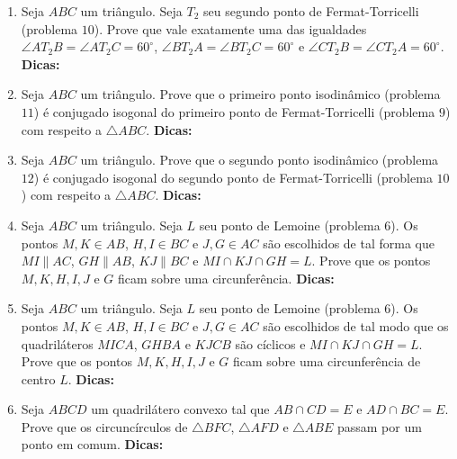 \documentclass{article}
\newcommand{\dica}{\textbf{Dicas:}}
\newcommand{\iniTri}{Seja $ABC$ um triângulo}
\begin{document}
\begin{multicols}{2}
\begin{enumerate}
    \item \iniTri. Seja $T_2$ seu segundo ponto de Fermat-Torricelli (problema $10$). Prove que vale exatamente uma das igualdades $\angle AT_2B=\angle AT_2C=60^{\circ}$, $\angle BT_2A=\angle BT_2C=60^{\circ}$ e $\angle CT_2B=\angle CT_2A=60^{\circ}$. \dica %
    
    \item \iniTri. Prove que o primeiro ponto isodinâmico (problema $11$) é conjugado isogonal do primeiro ponto de Fermat-Torricelli (problema $9$) com respeito a $\triangle ABC$. \dica %
    
    \item \iniTri. Prove que o segundo ponto isodinâmico (problema $12$) é conjugado isogonal do segundo ponto de Fermat-Torricelli (problema $10$) com respeito a $\triangle ABC$. \dica %
    
    \item \iniTri. Seja $L$ seu ponto de Lemoine (problema $6$). Os pontos $M,K\in AB$, $H,I\in BC$ e $J,G\in AC$ são escolhidos de tal forma que $MI\parallel AC$, $GH\parallel AB$, $KJ\parallel BC$ e $MI\cap KJ\cap GH=L$. Prove que os pontos $M,K,H,I,J$ e $G$ ficam sobre uma circunferência. \dica %
    
    \item \iniTri. Seja $L$ seu ponto de Lemoine (problema $6$). Os pontos $M,K\in AB$, $H,I\in BC$ e $J,G\in AC$ são escolhidos de tal modo que os quadriláteros $MICA$, $GHBA$ e $KJCB$ são cíclicos e $MI\cap KJ\cap GH=L$. Prove que os pontos $M,K,H,I,J$ e $G$ ficam sobre uma circunferência de centro $L$. \dica %
    
    \item Seja $ABCD$ um quadrilátero convexo tal que $AB\cap CD=E$ e $AD\cap BC=E$. Prove que os circuncírculos de $\triangle BFC$, $\triangle AFD$ e $\triangle ABE$ passam por um ponto em comum. \dica %
    

\end{enumerate}
\end{multicols}
\end{document}
